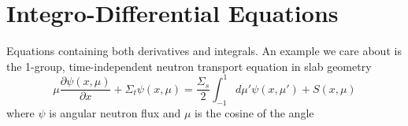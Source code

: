\documentclass[12pt]{article}
\newcommand{\Macro}{\ensuremath{\Sigma}}
\begin{document}
%
%




\section{Integro-Differential Equations}

Equations containing both derivatives and integrals. An example we care about is the 1-group, time-independent neutron transport equation in slab geometry
%
\begin{equation}
\mu \frac{\partial \psi(x,\mu)}{\partial x} + \Macro_t \psi(x,\mu) = \frac{\Macro_s}{2} \int_{-1}^1 d\mu' \psi(x, \mu') + S(x, \mu) \nonumber
\end{equation}
%
where $\psi$ is angular neutron flux and $\mu$ is the cosine of the angle
\end{document}
